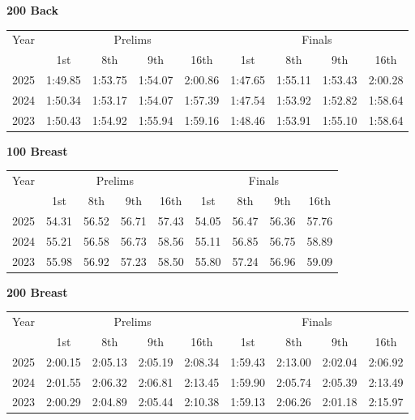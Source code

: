 \textbf{200 Back}

\begin{flushleft}
\begin{tabular}{|c|c|c|c|c|c|c|c|c|}
\hline
Year & \multicolumn{4}{c|}{Prelims} & \multicolumn{4}{c|}{Finals} \\
\cline{2-9}
& 1st & 8th & 9th & 16th & 1st & 8th & 9th & 16th \\
\hline
2025 & 1:49.85 & 1:53.75 & 1:54.07 & 2:00.86 & 1:47.65 & 1:55.11 & 1:53.43 & 2:00.28 \\
2024 & 1:50.34 & 1:53.17 & 1:54.07 & 1:57.39 & 1:47.54 & 1:53.92 & 1:52.82 & 1:58.64 \\
2023 & 1:50.43 & 1:54.92 & 1:55.94 & 1:59.16 & 1:48.46 & 1:53.91 & 1:55.10 & 1:58.64 \\
\hline
\end{tabular}
\end{flushleft}

\textbf{100 Breast}

\begin{flushleft}
\begin{tabular}{|c|c|c|c|c|c|c|c|c|}
\hline
Year & \multicolumn{4}{c|}{Prelims} & \multicolumn{4}{c|}{Finals} \\
\cline{2-9}
& 1st & 8th & 9th & 16th & 1st & 8th & 9th & 16th \\
\hline
2025 & 54.31 & 56.52 & 56.71 & 57.43 & 54.05 & 56.47 & 56.36 & 57.76 \\
2024 & 55.21 & 56.58 & 56.73 & 58.56 & 55.11 & 56.85 & 56.75 & 58.89 \\
2023 & 55.98 & 56.92 & 57.23 & 58.50 & 55.80 & 57.24 & 56.96 & 59.09 \\
\hline
\end{tabular}
\end{flushleft}

\textbf{200 Breast}

\begin{flushleft}
\begin{tabular}{|c|c|c|c|c|c|c|c|c|}
\hline
Year & \multicolumn{4}{c|}{Prelims} & \multicolumn{4}{c|}{Finals} \\
\cline{2-9}
& 1st & 8th & 9th & 16th & 1st & 8th & 9th & 16th \\
\hline
2025 & 2:00.15 & 2:05.13 & 2:05.19 & 2:08.34 & 1:59.43 & 2:13.00 & 2:02.04 & 2:06.92 \\
2024 & 2:01.55 & 2:06.32 & 2:06.81 & 2:13.45 & 1:59.90 & 2:05.74  & 2:05.39  & 2:13.49 \\
2023 & 2:00.29 & 2:04.89 & 2:05.44 & 2:10.38 & 1:59.13 & 2:06.26 & 2:01.18 & 2:15.97 \\
\hline
\end{tabular}
\end{flushleft}

